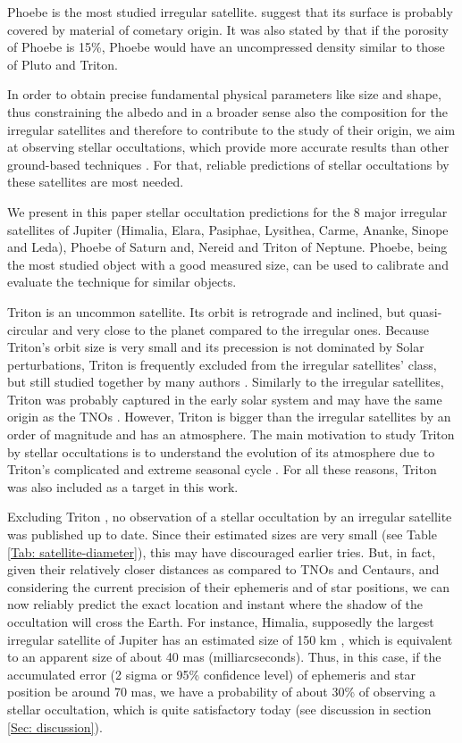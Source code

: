 \documentclass[useAMS,usenatbib]{mn2e}
\begin{document}
Phoebe is the most studied irregular satellite. \cite{Clark2005} suggest that its surface is probably covered by material of cometary origin. It was also stated by \cite{Johnson2005} that if the porosity of Phoebe is 15\%, Phoebe would have an uncompressed density similar to those of Pluto and Triton.

In order to obtain precise fundamental physical parameters like size and shape, thus constraining the albedo and in a broader sense also the composition for the irregular satellites and therefore to contribute to the study of their origin, we aim at observing stellar occultations, which provide  more accurate results than other ground-based techniques \citep{Sicardy2011, Ortiz2012, Braga-Ribas2014}. For that, reliable predictions of stellar occultations by these satellites are most needed.

We present in this paper stellar occultation predictions for the 8 major irregular satellites of Jupiter (Himalia, Elara, Pasiphae, Lysithea, Carme, Ananke, Sinope and Leda), Phoebe of Saturn and, Nereid and Triton of Neptune. Phoebe, being the most studied object with a good measured size, can be used to calibrate and evaluate the technique for similar objects.

Triton is an uncommon satellite. Its orbit is retrograde and inclined, but quasi-circular and very close to the planet compared to the irregular ones. Because Triton's orbit size is very small and its precession is not dominated by Solar perturbations, Triton is frequently excluded from the irregular satellites' class, but still studied together by many authors \citep{Sheppard2005, Jewitt2007}. Similarly to the irregular satellites, Triton was probably captured in the early solar system and may have the same origin as the TNOs \citep{Agnor2006}. However, Triton is bigger than the irregular satellites by an order of magnitude and has an atmosphere. The main motivation to study Triton by stellar occultations is to understand the evolution of its atmosphere due to Triton's complicated and extreme seasonal cycle \citep{McKinnon2007, Elliot_2000}. For all these reasons, Triton was also included as a target in this work.

Excluding Triton \citep{Olkin1997, Elliot_2000}, no observation of a stellar occultation by an irregular satellite was published up to date. Since their estimated sizes are very small (see Table \ref{Tab: satellite-diameter}), this may have discouraged earlier tries. But, in fact, given their relatively closer distances as compared to TNOs and Centaurs, and considering the current precision of their ephemeris and of star positions, we can now reliably predict the exact location and instant where the shadow of the occultation will cross the Earth. For instance, Himalia, supposedly the largest irregular satellite of Jupiter has an estimated size of 150 km \citep{Porco2003}, which is equivalent to an apparent size of about 40 mas (milliarcseconds). Thus, in this case, if the accumulated error (2 sigma or 95\% confidence level) of ephemeris and star position be around 70 mas, we have a probability of about 30\% of observing a stellar occultation, which is quite satisfactory today (see discussion in section \ref{Sec: discussion}).
\end{document}
